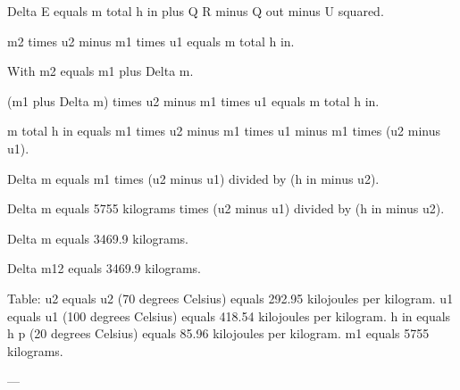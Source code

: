 Delta E equals m total h in plus Q R minus Q out minus U squared.  

m2 times u2 minus m1 times u1 equals m total h in.  

With m2 equals m1 plus Delta m.  

(m1 plus Delta m) times u2 minus m1 times u1 equals m total h in.  

m total h in equals m1 times u2 minus m1 times u1 minus m1 times (u2 minus u1).  

Delta m equals m1 times (u2 minus u1) divided by (h in minus u2).  

Delta m equals 5755 kilograms times (u2 minus u1) divided by (h in minus u2).  

Delta m equals 3469.9 kilograms.  

Delta m12 equals 3469.9 kilograms.  

Table:  
u2 equals u2 (70 degrees Celsius) equals 292.95 kilojoules per kilogram.  
u1 equals u1 (100 degrees Celsius) equals 418.54 kilojoules per kilogram.  
h in equals h p (20 degrees Celsius) equals 85.96 kilojoules per kilogram.  
m1 equals 5755 kilograms.  

---